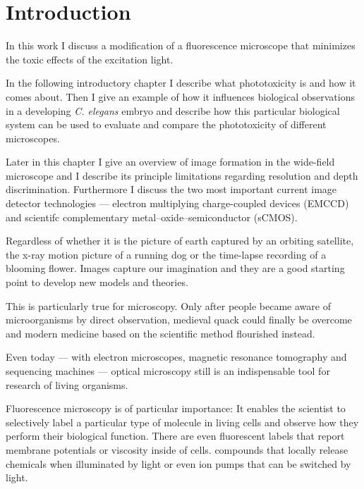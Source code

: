 \chapter{Introduction}
\label{sec:intro}
\begin{summary}
  In this work I discuss a modification of a fluorescence microscope    
  that minimizes the toxic effects of the excitation light.

  In the following introductory chapter I describe what phototoxicity   
  is and how it comes about. Then I give an example of how it
  influences biological observations in a developing \emph{C. elegans}
  embryo and describe how this particular biological system can be
  used to evaluate and compare the phototoxicity of different microscopes.

  Later in this chapter I give an overview of image formation   
  in the wide-field microscope and I describe its principle limitations
  regarding resolution and depth discrimination. Furthermore I
  discuss the two most important current image detector technologies
  --- electron multiplying charge-coupled devices (EMCCD) and
  scientifc complementary metal–oxide–semiconductor (sCMOS).
\end{summary}
Regardless of whether it is the picture of earth captured by an
orbiting satellite, the x-ray motion picture of a running dog or the
time-lapse recording of a blooming flower. Images capture our
imagination and they are a good starting point to develop new models
and theories.

This is particularly true for microscopy.  Only after people became
aware of microorganisms by direct observation, medieval quack could
finally be overcome and modern medicine based on the scientific
method flourished instead.

Even today --- with electron microscopes, magnetic resonance
tomography and sequencing machines --- optical microscopy still is an
indispensable tool for research of living organisms.

Fluorescence microscopy is of particular importance: It enables the     
scientist to selectively label a particular type of molecule in living cells
and observe how they perform their biological function. There are even
fluorescent labels that report membrane potentials or viscosity inside of 
cells. compounds that locally release chemicals when illuminated by
light or even ion pumps that can be switched by light.



